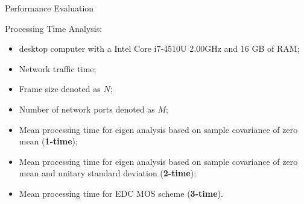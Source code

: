 \documentclass[newPxFont, numfooter, sectionpages]{beamer}
\begin{document}
\begin{frame}{Performance Evaluation}
	
	Processing Time Analysis:
	\begin{itemize}
		\item desktop computer with a Intel Core i7-4510U 2.00GHz and 16 GB of RAM;
		\item Network traffic time; 
		\item Frame size denoted as $N$; 
		\item Number of network ports denoted as $M$; 
		\item Mean processing time for eigen analysis based on sample covariance of zero mean (\textbf{1-time}); 
		\item Mean processing time for eigen analysis based on sample covariance of zero mean and unitary standard deviation (\textbf{2-time}); 
		\item Mean processing time for EDC MOS scheme (\textbf{3-time}).
	\end{itemize}
	
\end{frame}
\end{document}
